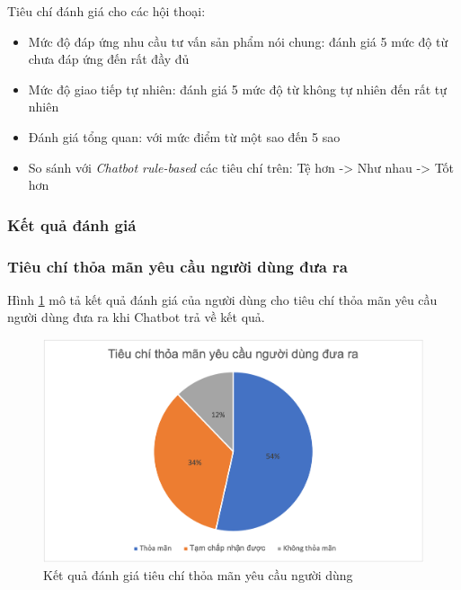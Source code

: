 Tiêu chí đánh giá cho các hội thoại:

\begin{itemize}
    \item Mức độ đáp ứng nhu cầu tư vấn sản phẩm nói chung: đánh giá 5 mức độ từ chưa đáp ứng đến rất đầy đủ
    \item Mức độ giao tiếp tự nhiên: đánh giá 5 mức độ từ không tự nhiên đến rất tự nhiên
    \item Đánh giá tổng quan: với mức điểm từ một sao đến 5 sao
    \item So sánh với \textit{Chatbot rule-based} các tiêu chí trên: Tệ hơn -> Như nhau -> Tốt hơn
\end{itemize}

\subsubsection{Kết quả đánh giá}
\subsubsection{Tiêu chí thỏa mãn yêu cầu người dùng đưa ra}
Hình \ref{fig:tieuchi1} mô tả kết quả đánh giá của người dùng cho tiêu chí thỏa mãn yêu cầu người dùng đưa ra khi Chatbot trả về kết quả.

\begin{center}
    \begin{figure}[ht!]
        \begin{center}
         \includegraphics[scale=0.91]{chapter7/img/tieuchi1.png}
        \end{center}
        \caption{Kết quả đánh giá tiêu chí thỏa mãn yêu cầu người dùng}
        \label{fig:tieuchi1}
    \end{figure}
\end{center}


